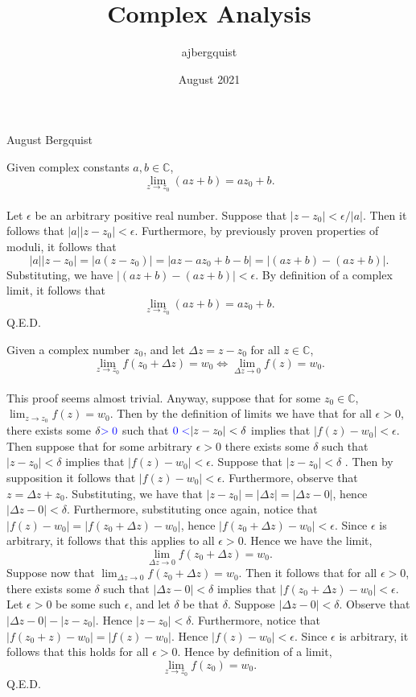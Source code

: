\documentclass{article}
\title{Complex Analysis}
\author{ajbergquist }
\date{August 2021}
\theoremstyle{definition}
\newcommand{\C}{\mathbb{C}}
\newcommand{\cs}[1]{\color{blue}{#1}\normalcolor}
\begin{document}
\hfill August Bergquist

 Given complex constants $a,b\in \C$,
$$\lim_{z\to z_0}(az+b) = az_0 + b.$$
\\
 Let $\epsilon$ be an arbitrary positive real number. Suppose that $|z-z_0| < \epsilon/|a|$. Then it follows that $|a||z-z_0| < \epsilon$. Furthermore, by previously proven properties of moduli, it follows that 
$$|a||z-z_0| = |a(z-z_0)| = |az-az_0 +b -b| = |(az+b) - (az+b)|.$$ Substituting, we have $|(az+b) - (az+b)| < \epsilon$. By definition of a complex limit, it follows that $$\lim_{z\to z_0}(az+b) = az_0 + b.$$ Q.E.D.\\

\cs{5/5}

 Given a complex number $z_0$, and let $\Delta z = z- z_0$ for all $z\in \C$,
$$\lim_{z\to z_0}f(z_0+\Delta z) = w_0 \Leftrightarrow \lim_{\Delta z \to 0}f(z) = w_0.$$\\
 This proof seems almost trivial. Anyway, suppose that for some $z_0\in \C$, $\lim_{z\to z_0}f(z) = w_0$. Then by the definition of limits we have that for all $\epsilon > 0$, there exists some $\delta\cs{>0}$ such that $\cs{0<}|z-z_0| < \delta$ implies that $|f(z)- w_0| < \epsilon$. Then suppose that for some arbitrary $\epsilon > 0$ there exists some $\delta$ such that $|z-z_0| < \delta$ implies that $|f(z) - w_0| < \epsilon$. Suppose that $|z-z_0|< \delta$ \cs{You want this to be $|\Delta z|<\delta$}. Then by supposition it follows that $|f(z) - w_0| < \epsilon$. Furthermore, observe that $z = \Delta z + z_0$. Substituting, we have that $|z-z_0| = |\Delta z| = |\Delta z - 0|$, hence $|\Delta z - 0| < \delta$. \cs{This is what you want to assume to start with.} Furthermore, substituting once again, notice that $|f(z)-w_0| = |f(z_0 + \Delta z) - w_0|$, hence $|f(z_0 + \Delta z) - w_0| < \epsilon$. Since $\epsilon$ is arbitrary, it follows that this applies to all $\epsilon > 0$. Hence we have the limit, $$\lim_{\Delta z \to 0}f(z_0+\Delta z)  = w_0.$$
Suppose now that $\lim_{\Delta z \to 0} f(z_0 + \Delta z) = w_0$. Then it follows that for all $\epsilon > 0$, there exists some $\delta$ such that $|\Delta z - 0| < \delta$ implies that $|f(z_0 + \Delta z) - w_0| < \epsilon$. Let $\epsilon > 0$ be some such $\epsilon$, and let $\delta$ be that $\delta$. Suppose $|\Delta z - 0| < \delta$. \cs{Similar issue: you want to start with $0<|z-z_0|<\delta.$} Observe that $|\Delta z - 0| - |z-z_0|$. Hence $|z- z_0| < \delta$. Furthermore, notice that $|f(z_0 + z) - w_0| = |f(z) - w_0|$. Hence $|f(z)- w_0| < \epsilon$. Since $\epsilon$ is arbitrary, it follows that this holds for all $\epsilon > 0$. Hence by definition of a limit, 
$$\lim_{z\to z_0} f(z_0) = w_0.$$ Q.E.D.

\cs{5/5}

\cs{10/10}
\end{document}
